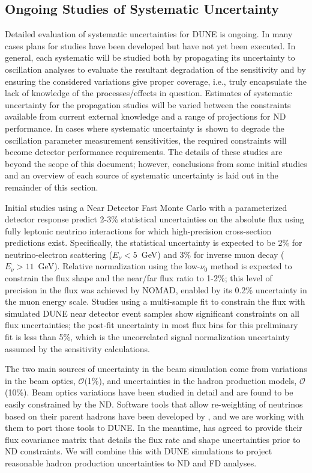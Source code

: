 \subsection{Ongoing Studies of Systematic Uncertainty}
\label{sec:syst_studies_ind}
Detailed evaluation of systematic uncertainties for DUNE is ongoing. In many cases plans for studies
have been developed but have not yet been executed. In general, each systematic will be studied both by
propagating its uncertainty to oscillation analyses to evaluate the resultant degradation of the sensitivity
and by ensuring the considered variations give proper coverage, i.e., truly encapsulate
the lack of knowledge of the processes/effects in question. Estimates of systematic uncertainty for the 
propagation studies will be varied between the constraints available from current external knowledge
and a range of projections for ND performance. In cases where systematic uncertainty is shown to
degrade the oscillation parameter
measurement sensitivities, the required constraints will become detector performance requirements.
The details of these studies are beyond the scope of this document; however, conclusions from some
initial studies and an overview of each source of systematic uncertainty is laid out in the remainder of
this section.

Initial studies using a Near Detector Fast Monte Carlo with a parameterized detector response
predict 2-3\% statistical uncertainties on the absolute flux using fully 
leptonic neutrino interactions for which high-precision cross-section predictions 
exist. Specifically,
the statistical uncertainty is expected to be 2\% for neutrino-electron
scattering ($E_\nu<5$~GeV) and 3\% for inverse muon decay ($E_\nu>11$~GeV).
Relative normalization using the low-$\nu_0$ method is
expected to constrain the flux shape and the near/far flux ratio to 1-2\%; this level of
precision in the \numu flux was achieved by NOMAD\cite{Wu:2007ab,Lyubushkin:2008pe}, enabled by its 0.2\%
uncertainty in the muon energy scale.
Studies using a multi-sample fit  to constrain the flux with simulated DUNE near detector
event samples show significant constraints on all flux
uncertainties; the post-fit uncertainty in most flux bins for this preliminary fit is less
than 5\%, which is the uncorrelated \numu signal normalization
uncertainty assumed by the sensitivity calculations. 

The two main sources of uncertainty in the beam simulation come from variations in the beam optics,
$\mathcal{O}($1\%), and uncertainties in the hadron production models, $\mathcal{O}$(10\%).
Beam optics variations have been studied in detail
and are found to be easily constrained by the ND. Software tools that
allow re-weighting of neutrinos based on their parent hadrons have been developed by \minerva, and we are working with
them to port those tools to DUNE. In the meantime, \minerva has agreed to provide their flux covariance matrix
that details the flux rate and shape uncertainties prior to ND constraints. We will combine this with DUNE
simulations to project reasonable hadron production uncertainties to ND and FD analyses.

